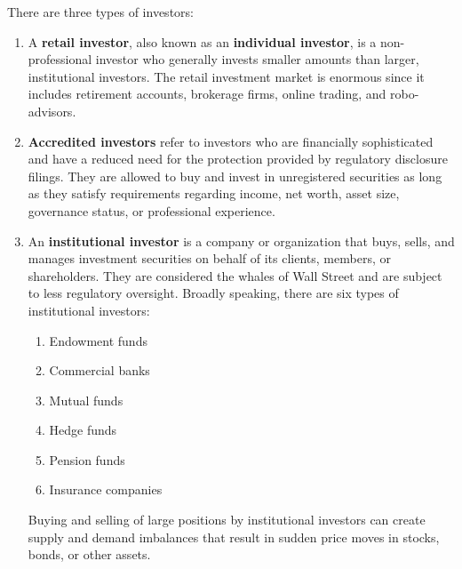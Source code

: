 \documentclass{article}
\begin{document}
    \begin{definition}
      There are three types of investors: 
      \begin{enumerate}
        \item A \textbf{retail investor}, also known as an \textbf{individual investor}, is a non-professional investor who generally invests smaller amounts than larger, institutional investors. The retail investment market is enormous since it includes retirement accounts, brokerage firms, online trading, and robo-advisors.
        \item \textbf{Accredited investors} refer to investors who are financially sophisticated and have a reduced need for the protection provided by regulatory disclosure filings. They are allowed to buy and invest in unregistered securities as long as they satisfy requirements regarding income, net worth, asset size, governance status, or professional experience. 
        \item An \textbf{institutional investor} is a company or organization that buys, sells, and manages investment securities on behalf of its clients, members, or shareholders. They are considered the whales of Wall Street and are subject to less regulatory oversight. Broadly speaking, there are six types of institutional investors: 
      \begin{enumerate}
        \item Endowment funds
        \item Commercial banks
        \item Mutual funds
        \item Hedge funds
        \item Pension funds
        \item Insurance companies
      \end{enumerate}
      Buying and selling of large positions by institutional investors can create supply and demand imbalances that result in sudden price moves in stocks, bonds, or other assets. 
      \end{enumerate}
    \end{definition}
\end{document}
